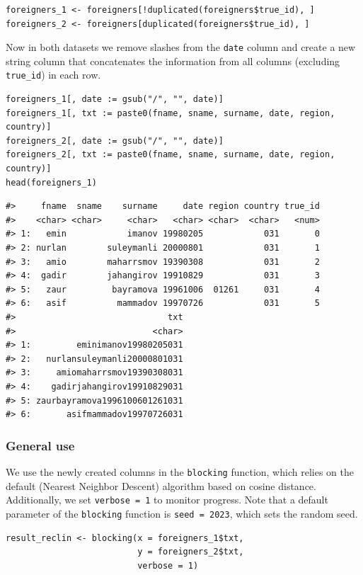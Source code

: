 \begin{verbatim}
foreigners_1 <- foreigners[!duplicated(foreigners$true_id), ]
foreigners_2 <- foreigners[duplicated(foreigners$true_id), ]
\end{verbatim}

Now in both datasets we remove slashes from the \texttt{date} column and create a new string column that concatenates the information from all columns (excluding \texttt{true\_id}) in each row.

\begin{verbatim}
foreigners_1[, date := gsub("/", "", date)]
foreigners_1[, txt := paste0(fname, sname, surname, date, region, country)]
foreigners_2[, date := gsub("/", "", date)]
foreigners_2[, txt := paste0(fname, sname, surname, date, region, country)]
head(foreigners_1)
\end{verbatim}

\begin{verbatim}
#>     fname  sname    surname     date region country true_id
#>    <char> <char>     <char>   <char> <char>  <char>   <num>
#> 1:   emin            imanov 19980205            031       0
#> 2: nurlan        suleymanli 20000801            031       1
#> 3:   amio        maharrsmov 19390308            031       2
#> 4:  gadir        jahangirov 19910829            031       3
#> 5:   zaur         bayramova 19961006  01261     031       4
#> 6:   asif          mammadov 19970726            031       5
#>                              txt
#>                           <char>
#> 1:         eminimanov19980205031
#> 2:   nurlansuleymanli20000801031
#> 3:     amiomaharrsmov19390308031
#> 4:    gadirjahangirov19910829031
#> 5: zaurbayramova1996100601261031
#> 6:       asifmammadov19970726031
\end{verbatim}

\subsubsection{General use}\label{general-use}

We use the newly created columns in the \texttt{blocking} function, which relies on the default  (Nearest Neighbor Descent) algorithm based on cosine distance. Additionally, we set \texttt{verbose\ =\ 1} to monitor progress. Note that a default parameter of the \texttt{blocking} function is \texttt{seed\ =\ 2023}, which sets the random seed.

\begin{verbatim}
result_reclin <- blocking(x = foreigners_1$txt,
                          y = foreigners_2$txt,
                          verbose = 1)
\end{verbatim}

